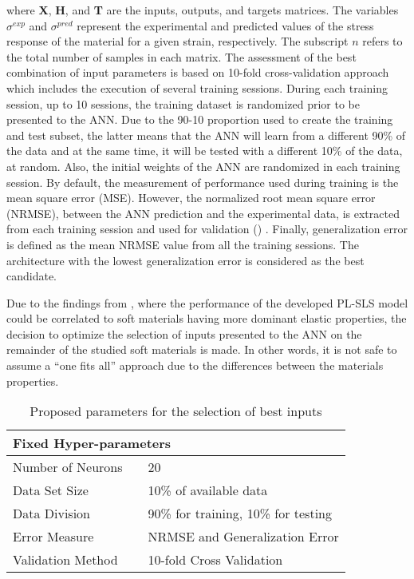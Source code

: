 \noindent where \textbf{X}, \textbf{H}, and \textbf{T} are the inputs, outputs, and targets matrices. The variables $\sigma^{exp}$ and $\sigma^{pred}$ represent the experimental and predicted values of the stress response of the material for a given strain, respectively. The subscript $n$ refers to the total number of samples in each matrix. The assessment of the best combination of input parameters is based on 10-fold cross-validation approach which includes the execution of several training sessions. During each training session, up to 10 sessions, the training dataset is randomized prior to be presented to the ANN. Due to the 90-10 proportion used to create the training and test subset, the latter means that the ANN will learn from a different 90\% of the data and at the same time, it will be tested with a different 10\% of the data, at random. Also, the initial weights of the ANN are randomized in each training session. By default, the measurement of performance used during training is the mean square error (MSE). However, the normalized root mean square error (NRMSE), between the ANN prediction and the experimental data, is extracted from each training session and used for validation () \cite{bergstrom2015mechanics}. Finally, generalization error is defined as the mean NRMSE value from all the training sessions. The architecture with the lowest generalization error is considered as the best candidate.

Due to the findings from , where the performance of the developed PL-SLS model could be correlated to soft materials having more dominant elastic properties, the decision to optimize the selection of inputs presented to the ANN on the remainder of the studied soft materials is made. In other words, it is not safe to assume a ``one fits all'' approach due to the differences between the materials properties. 

\begin{table}[htbp!]
    \centering
    \caption{Proposed parameters for the selection of best inputs}
    \begin{tabular}{l m{1cm} l}
    \toprule
    \multicolumn{3}{l}{Fixed Hyper-parameters} \\
    \hline
    Number of Neurons           & & 20 \\
    Data Set Size               & & 10\% of available data\\
    Data Division               & & 90\% for training, 10\% for testing\\
    Error Measure               & & NRMSE and Generalization Error\\
    Validation Method           & & 10-fold Cross Validation\\
    \bottomrule
    \end{tabular}
    \label{tbl:ANN_InputSelParameters}
\end{table}


